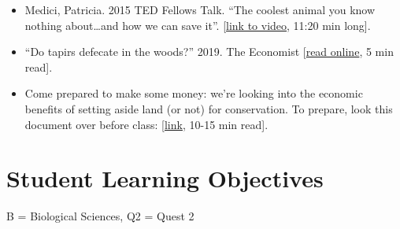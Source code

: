 \documentclass[
  10pt,
  letterpaper,
  oneside,
  open=any]{scrbook}
\begin{document}
\begin{itemize}
\item
  Medici, Patricia. 2015 TED Fellows Talk. ``The coolest animal you know
  nothing about\ldots and how we can save it''.
  {[}\href{https://www.ted.com/talks/patricia_medici_the_coolest_animal_you_know_nothing_about_and_how_we_can_save_it\#t-694653}{link
  to video}, 11:20 min long{]}.
\item
  ``Do tapirs defecate in the woods?'' 2019. The Economist
  {[}\href{https://www.economist.com/science-and-technology/2019/04/17/do-tapirs-defecate-in-the-woods}{read
  online}, 5 min read{]}.
\item
  Come prepared to make some money: we're looking into the economic
  benefits of setting aside land (or not) for conservation. To prepare,
  look this document over before class:
  {[}\href{https://www.tandfonline.com/doi/full/10.1080/00220485.2016.1146098}{link},
  10-15 min read{]}.
\end{itemize}


\chapter{Student Learning Objectives}\label{student-learning-objectives}

B = Biological Sciences, Q2 = Quest 2
\end{document}
